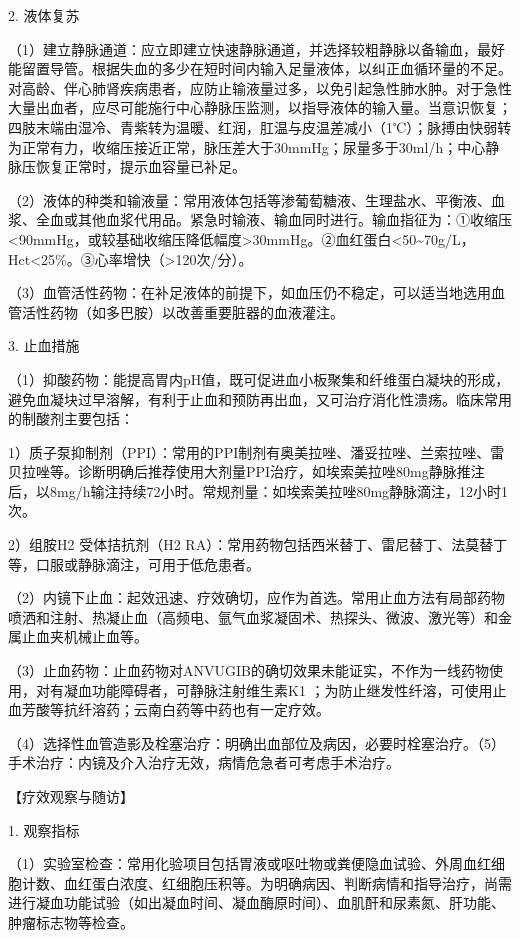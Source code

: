 2. 液体复苏

（1）建立静脉通道：应立即建立快速静脉通道，并选择较粗静脉以备输血，最好能留置导管。根据失血的多少在短时间内输入足量液体，以纠正血循环量的不足。对高龄、伴心肺肾疾病患者，应防止输液量过多，以免引起急性肺水肿。对于急性大量出血者，应尽可能施行中心静脉压监测，以指导液体的输入量。当意识恢复；四肢末端由湿冷、青紫转为温暖、红润，肛温与皮温差减小（1℃）；脉搏由快弱转为正常有力，收缩压接近正常，脉压差大于30mmHg；尿量多于30ml/h；中心静脉压恢复正常时，提示血容量已补足。

（2）液体的种类和输液量：常用液体包括等渗葡萄糖液、生理盐水、平衡液、血浆、全血或其他血浆代用品。紧急时输液、输血同时进行。输血指征为：①收缩压\textless{}90mmHg，或较基础收缩压降低幅度\textgreater{}30mmHg。②血红蛋白\textless{}50\textasciitilde{}70g/L，Hct\textless{}25\%。③心率增快（\textgreater{}120次/分）。

（3）血管活性药物：在补足液体的前提下，如血压仍不稳定，可以适当地选用血管活性药物（如多巴胺）以改善重要脏器的血液灌注。

3. 止血措施

（1）抑酸药物：能提高胃内pH值，既可促进血小板聚集和纤维蛋白凝块的形成，避免血凝块过早溶解，有利于止血和预防再出血，又可治疗消化性溃疡。临床常用的制酸剂主要包括：

1）质子泵抑制剂（PPI）：常用的PPI制剂有奥美拉唑、潘妥拉唑、兰索拉唑、雷贝拉唑等。诊断明确后推荐使用大剂量PPI治疗，如埃索美拉唑80mg静脉推注后，以8mg/h输注持续72小时。常规剂量：如埃索美拉唑80mg静脉滴注，12小时1次。

2）组胺H{2} 受体拮抗剂（H{2}
RA）：常用药物包括西米替丁、雷尼替丁、法莫替丁等，口服或静脉滴注，可用于低危患者。

（2）内镜下止血：起效迅速、疗效确切，应作为首选。常用止血方法有局部药物喷洒和注射、热凝止血（高频电、氩气血浆凝固术、热探头、微波、激光等）和金属止血夹机械止血等。

（3）止血药物：止血药物对ANVUGIB的确切效果未能证实，不作为一线药物使用，对有凝血功能障碍者，可静脉注射维生素K{1}
；为防止继发性纤溶，可使用止血芳酸等抗纤溶药；云南白药等中药也有一定疗效。

（4）选择性血管造影及栓塞治疗：明确出血部位及病因，必要时栓塞治疗。（5）手术治疗：内镜及介入治疗无效，病情危急者可考虑手术治疗。

【疗效观察与随访】

1. 观察指标

（1）实验室检查：常用化验项目包括胃液或呕吐物或粪便隐血试验、外周血红细胞计数、血红蛋白浓度、红细胞压积等。为明确病因、判断病情和指导治疗，尚需进行凝血功能试验（如出凝血时间、凝血酶原时间）、血肌酐和尿素氮、肝功能、肿瘤标志物等检查。

